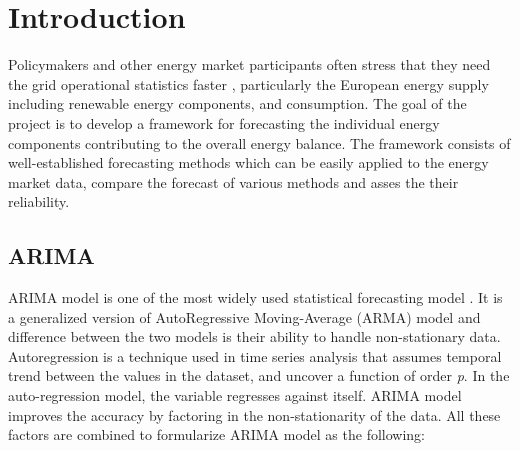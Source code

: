 \documentclass[acmtog]{acmart}
\begin{document}
\maketitle

\section{Introduction}
Policymakers and other energy market participants often stress that they need the grid operational statistics faster \cite{eu_nowcasting}, particularly the European energy supply including renewable energy components, and consumption. The goal of the project is to develop a framework for forecasting the individual energy components contributing to the overall energy balance. The framework consists of well-established forecasting methods which can be easily applied to the energy market data, compare the forecast of various methods and asses the their reliability.


\subsection{ARIMA}
ARIMA model is one of the most widely used statistical forecasting model \cite{enders2014introduction}. It is a generalized version of AutoRegressive Moving-Average (ARMA) model and difference between the two models is their ability to handle non-stationary data. %
Autoregression is a technique used in time series analysis that assumes temporal trend between the values in the dataset, and uncover a function of order \textit{p}. In the auto-regression model, the variable regresses against itself. 
ARIMA model \cite{hong2019core} improves the accuracy by factoring in the non-stationarity of the data. All these factors are combined to formularize ARIMA model as the following:
\end{document}
